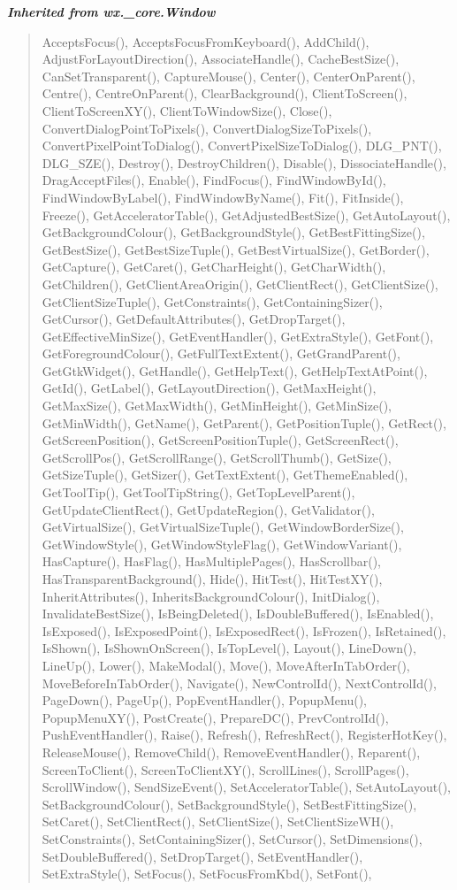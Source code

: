 \large{\textbf{\textit{Inherited from wx.\_core.Window}}}

\begin{quote}
AcceptsFocus(), AcceptsFocusFromKeyboard(), AddChild(), AdjustForLayoutDirection(), AssociateHandle(), CacheBestSize(), CanSetTransparent(), CaptureMouse(), Center(), CenterOnParent(), Centre(), CentreOnParent(), ClearBackground(), ClientToScreen(), ClientToScreenXY(), ClientToWindowSize(), Close(), ConvertDialogPointToPixels(), ConvertDialogSizeToPixels(), ConvertPixelPointToDialog(), ConvertPixelSizeToDialog(), DLG\_PNT(), DLG\_SZE(), Destroy(), DestroyChildren(), Disable(), DissociateHandle(), DragAcceptFiles(), Enable(), FindFocus(), FindWindowById(), FindWindowByLabel(), FindWindowByName(), Fit(), FitInside(), Freeze(), GetAcceleratorTable(), GetAdjustedBestSize(), GetAutoLayout(), GetBackgroundColour(), GetBackgroundStyle(), GetBestFittingSize(), GetBestSize(), GetBestSizeTuple(), GetBestVirtualSize(), GetBorder(), GetCapture(), GetCaret(), GetCharHeight(), GetCharWidth(), GetChildren(), GetClientAreaOrigin(), GetClientRect(), GetClientSize(), GetClientSizeTuple(), GetConstraints(), GetContainingSizer(), GetCursor(), GetDefaultAttributes(), GetDropTarget(), GetEffectiveMinSize(), GetEventHandler(), GetExtraStyle(), GetFont(), GetForegroundColour(), GetFullTextExtent(), GetGrandParent(), GetGtkWidget(), GetHandle(), GetHelpText(), GetHelpTextAtPoint(), GetId(), GetLabel(), GetLayoutDirection(), GetMaxHeight(), GetMaxSize(), GetMaxWidth(), GetMinHeight(), GetMinSize(), GetMinWidth(), GetName(), GetParent(), GetPositionTuple(), GetRect(), GetScreenPosition(), GetScreenPositionTuple(), GetScreenRect(), GetScrollPos(), GetScrollRange(), GetScrollThumb(), GetSize(), GetSizeTuple(), GetSizer(), GetTextExtent(), GetThemeEnabled(), GetToolTip(), GetToolTipString(), GetTopLevelParent(), GetUpdateClientRect(), GetUpdateRegion(), GetValidator(), GetVirtualSize(), GetVirtualSizeTuple(), GetWindowBorderSize(), GetWindowStyle(), GetWindowStyleFlag(), GetWindowVariant(), HasCapture(), HasFlag(), HasMultiplePages(), HasScrollbar(), HasTransparentBackground(), Hide(), HitTest(), HitTestXY(), InheritAttributes(), InheritsBackgroundColour(), InitDialog(), InvalidateBestSize(), IsBeingDeleted(), IsDoubleBuffered(), IsEnabled(), IsExposed(), IsExposedPoint(), IsExposedRect(), IsFrozen(), IsRetained(), IsShown(), IsShownOnScreen(), IsTopLevel(), Layout(), LineDown(), LineUp(), Lower(), MakeModal(), Move(), MoveAfterInTabOrder(), MoveBeforeInTabOrder(), Navigate(), NewControlId(), NextControlId(), PageDown(), PageUp(), PopEventHandler(), PopupMenu(), PopupMenuXY(), PostCreate(), PrepareDC(), PrevControlId(), PushEventHandler(), Raise(), Refresh(), RefreshRect(), RegisterHotKey(), ReleaseMouse(), RemoveChild(), RemoveEventHandler(), Reparent(), ScreenToClient(), ScreenToClientXY(), ScrollLines(), ScrollPages(), ScrollWindow(), SendSizeEvent(), SetAcceleratorTable(), SetAutoLayout(), SetBackgroundColour(), SetBackgroundStyle(), SetBestFittingSize(), SetCaret(), SetClientRect(), SetClientSize(), SetClientSizeWH(), SetConstraints(), SetContainingSizer(), SetCursor(), SetDimensions(), SetDoubleBuffered(), SetDropTarget(), SetEventHandler(), SetExtraStyle(), SetFocus(), SetFocusFromKbd(), SetFont(), 
\end{quote}
